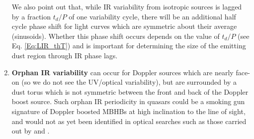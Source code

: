 \begin{enumerate}
{We also point out that, while IR variability from isotropic sources is lagged by
a fraction $t_d/P$ of one variability cycle, there will be an additional half
cycle phase shift for light curves which are symmetric about their average
(sinusoids). Whether this phase shift occurs depends on the value of $t_d/P$
(see Eq. \ref{Eq:LIR_thT}) and is important for determining the size of the
emitting dust region through IR phase lags. } 
%
\item{
\textbf{Orphan IR variability} can occur for Doppler sources which are nearly
face-on (so we do not see the UV/optical variability), but are surrounded by a
dust torus which is not symmetric between the front and back of the Doppler
boost source. Such orphan IR periodicity in quasars could be a smoking gun
signature of Doppler boosted MBHBs at high inclination to the line of sight,
and would not as yet been identified in optical searches such as those carried
out by \cite{Graham+2015b} and \citep{Charisi+2016}. }

\end{enumerate}


 

